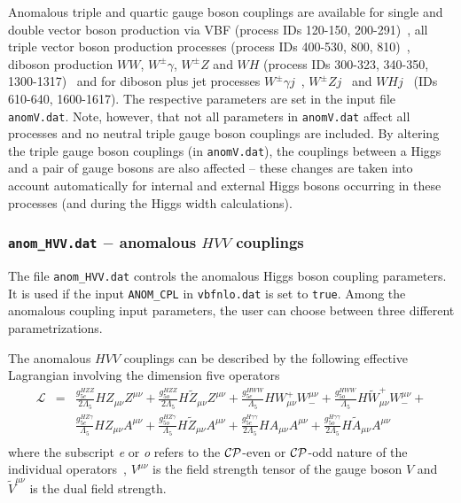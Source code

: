 \documentclass[english,12pt]{article}
\begin{document}
Anomalous triple and quartic gauge boson couplings are available for single
and double vector boson production via VBF (process IDs 120-150, 200-291)~\cite{anomWW,anomVBF},
all triple vector boson production processes (process IDs 400-530, 800, 810)~\cite{anomVVV,anomVBF}, diboson
production $WW$, $W^{\pm}\gamma$, $W^{\pm}Z$ and $WH$ (process IDs 300-323, 340-350, 1300-1317)~\cite{johannes,robin}
and for diboson plus jet processes $W^{\pm}\gamma j$~\cite{Campanario:2010xn}, $W^{\pm}Zj$~\cite{Campanario:2010hv}
and $WH j$~\cite{robin} (IDs 610-640, 1600-1617). The respective
parameters are set in the input file {\tt anomV.dat}.  Note, however, that not all
parameters in {\tt anomV.dat} affect all processes and no neutral triple gauge boson couplings are included.
By altering the triple gauge boson couplings (in {\tt anomV.dat}), the couplings between a Higgs and a
pair of gauge bosons are also affected -- these changes are taken into account
automatically for internal and external Higgs bosons occurring in these processes (and during the Higgs width
calculations). 

\subsubsection{{\tt anom\_HVV.dat} $-$ anomalous $HVV$ couplings}
\label{sec:HVV}
The file {\tt anom\_HVV.dat} controls the anomalous Higgs boson coupling parameters. 
It is used if the input {\tt ANOM\_CPL} in {\tt vbfnlo.dat} is set to {\tt true}. 
Among the anomalous coupling input parameters, the user can choose between three
different parametrizations.

The anomalous $HVV$ couplings can be described by the following effective Lagrangian involving the dimension five operators
%
\begin{eqnarray}
\label{eq:efflag}
 \mathcal{L} &=& \frac{g_{5e}^{HZZ}}{2 \Lambda_{5}} H Z_{\mu \nu} Z^{\mu \nu} + \frac{g_{5o}^{HZZ}}{2 \Lambda_{5}} H \widetilde{Z}_{\mu \nu} Z^{\mu \nu} + \frac{g_{5e}^{HWW}}{\Lambda_{5}} H W^{+}_{\mu \nu} W_{-}^{\mu \nu} + \frac{g_{5o}^{HWW}}{\Lambda_{5}} H \widetilde{W}^{+}_{\mu \nu} W_{-}^{\mu \nu} + \nonumber \\
%
&& \frac{g_{5e}^{HZ\gamma}}{\Lambda_{5}} H Z_{\mu \nu} A^{\mu \nu} + \frac{g_{5o}^{HZ\gamma}}{\Lambda_{5}} H \widetilde{Z}_{\mu \nu} A^{\mu \nu} + \frac{g_{5e}^{H\gamma \gamma}}{2 \Lambda_{5}} H A_{\mu \nu} A^{\mu \nu} + \frac{g_{5o}^{H\gamma \gamma}}{2 \Lambda_{5}} H \widetilde{A}_{\mu \nu} A^{\mu \nu} \nonumber \\
\end{eqnarray}
%
where the subscript {\em e} or {\em o} refers to the $\cal{CP}$-even
or $\cal{CP}$-odd nature of the individual operators~\cite{Figy:2004pt}, $V^{\mu\nu}$ is the field strength tensor of the gauge boson $V$ and $\widetilde{V}^{\mu\nu}$ is the dual field strength.
\end{document}
